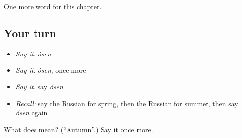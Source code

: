 \begin{grammarlens}[title={What you've built}]
One more word for this chapter.
\end{grammarlens}

\subsection*{Your turn}
\begin{itemize}
\raggedright
  \item \emph{Say it:} \emph{ósen}
  \item \emph{Say it:} \emph{ósen}, once more
  \item \emph{Say it:} say \emph{ósen}
  \item \emph{Recall:} say the Russian for spring, then the Russian for summer, then say \emph{ósen} again
\end{itemize}

\begin{tcolorbox}[breakable,colback=teal!4,colframe=teal!35!black,title={Before you move on}]
What does  mean? (\textquotedblleft{}Autumn\textquotedblright{}.) Say it once more.
\end{tcolorbox}
